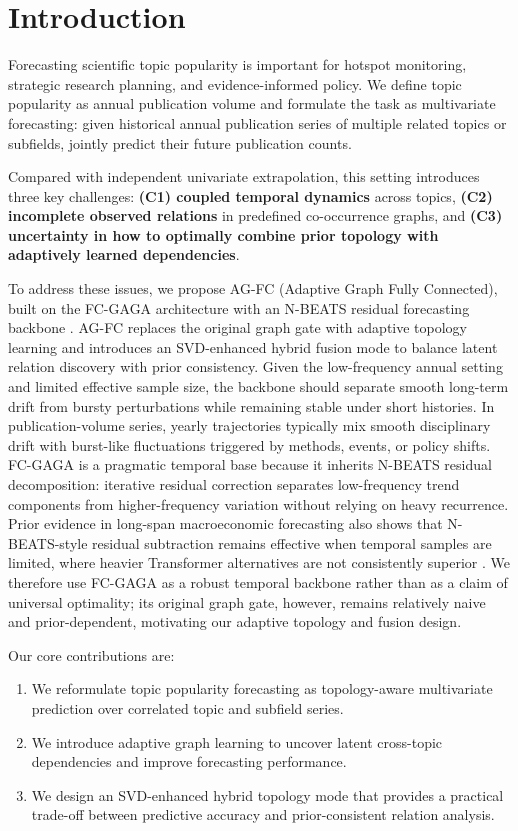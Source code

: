 \documentclass[runningheads]{llncs}
\begin{document}
\section{Introduction}
Forecasting scientific topic popularity is important for hotspot monitoring, strategic research planning, and evidence-informed policy. We define topic popularity as annual publication volume and formulate the task as multivariate forecasting: given historical annual publication series of multiple related topics or subfields, jointly predict their future publication counts.

Compared with independent univariate extrapolation, this setting introduces three key challenges: \textbf{(C1) coupled temporal dynamics} across topics, \textbf{(C2) incomplete observed relations} in predefined co-occurrence graphs, and \textbf{(C3) uncertainty in how to optimally combine prior topology with adaptively learned dependencies}.

To address these issues, we propose AG-FC (Adaptive Graph Fully Connected), built on the FC-GAGA architecture with an N-BEATS residual forecasting backbone \cite{Oreshkin2020N-BEATS:,oreshkin2021fc}. AG-FC replaces the original graph gate with adaptive topology learning \cite{wu2019graph} and introduces an SVD-enhanced hybrid fusion mode to balance latent relation discovery with prior consistency.
Given the low-frequency annual setting and limited effective sample size, the backbone should separate smooth long-term drift from bursty perturbations while remaining stable under short histories. In publication-volume series, yearly trajectories typically mix smooth disciplinary drift with burst-like fluctuations triggered by methods, events, or policy shifts. FC-GAGA is a pragmatic temporal base because it inherits N-BEATS residual decomposition: iterative residual correction separates low-frequency trend components from higher-frequency variation without relying on heavy recurrence. Prior evidence in long-span macroeconomic forecasting also shows that N-BEATS-style residual subtraction remains effective when temporal samples are limited, where heavier Transformer alternatives are not consistently superior \cite{wang2022ecoforecast}. We therefore use FC-GAGA as a robust temporal backbone rather than as a claim of universal optimality; its original graph gate, however, remains relatively naive and prior-dependent, motivating our adaptive topology and fusion design.

Our core contributions are:
\begin{enumerate}
    \item We reformulate topic popularity forecasting as topology-aware multivariate prediction over correlated topic and subfield series.
    \item We introduce adaptive graph learning to uncover latent cross-topic dependencies and improve forecasting performance.
    \item We design an SVD-enhanced hybrid topology mode that provides a practical trade-off between predictive accuracy and prior-consistent relation analysis.
\end{enumerate}
\end{document}
